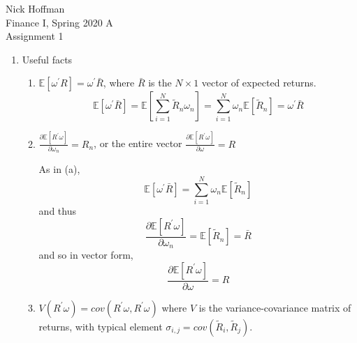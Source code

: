 \documentclass[11pt]{article}
\newcommand{\w}{\omega}
\newcommand{\p}{\prime}
\newcommand{\ev}{\mathbb{E}}
\begin{document}
	
\begin{flushleft}
	Nick Hoffman \\
	Finance I, Spring 2020 A \\
	Assignment 1 \\
\end{flushleft}

\begin{enumerate}
	\item Useful facts
	\begin{enumerate}
		\item $ \ev[\w ^\p R ] = \w^\p \bar{R} $, where $\bar{R}$ is the $ N\times 1 $ vector of expected returns.
		\[\ev[\w^\p \bar{R}] = \ev\left[\sum_{i = 1}^{N}\tilde{R}_n \w_n\right] = \sum_{i = 1}^N \w_n \ev[\tilde{R}_n] = \w^\p \bar{R} \]
		
		\item $ \frac{\partial \ev[R^\p \w]}{\partial \w_n} = R_n $, or the entire vector $  \frac{\partial \ev[R^\p \w]}{\partial \w} = R $
		
		As in (a),
		\[\ev[\w^\p \bar{R}] =\sum_{i = 1}^N \w_n \ev[\tilde{R}_n]\]
		and thus
		\[\frac{\partial \ev[R^\p \w]}{\partial \w_n} = \ev[\tilde{R}_n] = \bar{R}\]
		and so in vector form,
		\[ \frac{\partial \ev[R^\p \w]}{\partial \w} = R\]
		
		\item $ V(R^\p \w) = cov(R^\p \w, R^\p \w) $ where $ V $ is the variance-covariance matrix of returns, with typical element $ \sigma_{i,j} = cov(\tilde{R}_i, \tilde{R}_j) $.
		

\end{enumerate}
\end{enumerate}
\end{document}

